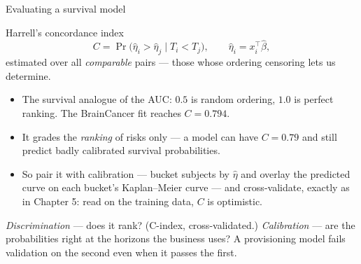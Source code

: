 \documentclass[aspectratio=169,11pt]{beamer}
\begin{document}
\begin{frame}{Evaluating a survival model}
  \scriptsize
  \begin{block}{Harrell's concordance index}
    \[
      C=\Pr\bigl(\hat\eta_i>\hat\eta_j \;\big|\; T_i<T_j\bigr),
      \qquad \hat\eta_i=x_i^{\top}\hat\beta ,
    \]
    estimated over all \emph{comparable} pairs --- those whose ordering censoring lets us
    determine.
  \end{block}
  \begin{readme}
    \begin{itemize}
      \item The survival analogue of the AUC: $0.5$ is random ordering, $1.0$ is perfect
            ranking. The BrainCancer fit reaches $C=0.794$.
      \item It grades the \emph{ranking} of risks only --- a model can have $C=0.79$ and
            still predict badly calibrated survival probabilities.
      \item So pair it with calibration --- bucket subjects by $\hat\eta$ and overlay the
            predicted curve on each bucket's Kaplan--Meier curve --- and cross-validate,
            exactly as in Chapter 5: read on the training data, $C$ is optimistic.
    \end{itemize}
  \end{readme}
  \begin{industry}
    \emph{Discrimination} --- does it rank? (C-index, cross-validated.) \emph{Calibration}
    --- are the probabilities right at the horizons the business uses? A provisioning model
    fails validation on the second even when it passes the first.
  \end{industry}
\end{frame}
\end{document}
